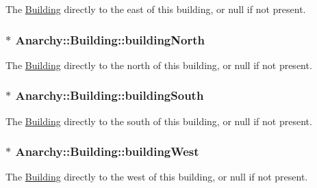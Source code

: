 The \hyperlink{classAnarchy_1_1Building}{Building} directly to the east of this building, or null if not present. 

\hypertarget{classAnarchy_1_1Building_aeed7b639ac2199c247d6b168a789acfc}{
\subsubsection[{building\-North}]{$\ast$ Anarchy\-::\-Building\-::building\-North}}\label{classAnarchy_1_1Building_aeed7b639ac2199c247d6b168a789acfc}


The \hyperlink{classAnarchy_1_1Building}{Building} directly to the north of this building, or null if not present. 

\hypertarget{classAnarchy_1_1Building_a12a304929ca4c48f717035b535078c46}{
\subsubsection[{building\-South}]{$\ast$ Anarchy\-::\-Building\-::building\-South}}\label{classAnarchy_1_1Building_a12a304929ca4c48f717035b535078c46}


The \hyperlink{classAnarchy_1_1Building}{Building} directly to the south of this building, or null if not present. 

\hypertarget{classAnarchy_1_1Building_accc6c555aa5cd0e02e88dc727e5fcd79}{
\subsubsection[{building\-West}]{$\ast$ Anarchy\-::\-Building\-::building\-West}}\label{classAnarchy_1_1Building_accc6c555aa5cd0e02e88dc727e5fcd79}


The \hyperlink{classAnarchy_1_1Building}{Building} directly to the west of this building, or null if not present. 


